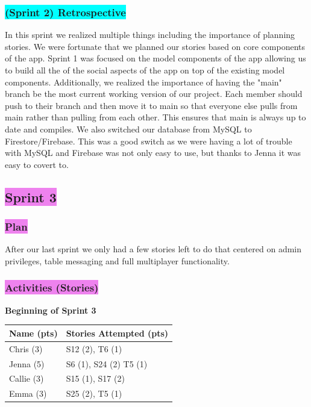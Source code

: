 \subsubsection{\colorbox{cyan}{(Sprint 2) Retrospective}}
In this sprint we realized multiple things including the importance of planning stories. We were fortunate that we planned our stories based on core components of the app. Sprint 1 was focused on the model components of the app allowing us to build all the of the social aspects of the app on top of the existing model components. Additionally, we realized the importance of having the "main" branch be the most current working version of our project. Each member should push to their branch and then move it to main so that everyone else pulls from main rather than pulling from each other. This ensures that main is always up to date and compiles. We also switched our database from MySQL to Firestore/Firebase. This was a good switch as we were having a lot of trouble with MySQL and Firebase was not only easy to use, but thanks to Jenna it was easy to covert to. 


\subsection{\colorbox{violet}{Sprint 3}}

\subsubsection{\colorbox{violet}{Plan}}

\noindent After our last sprint we only had a few stories left to do that centered on admin privileges, table messaging and full multiplayer functionality.

\subsubsection{\colorbox{violet}{Activities (Stories)}}

\textbf{Beginning of Sprint 3}

\begin{table}[!hbt]
\begin{tabular}{|l|l|}
\hline
\multicolumn{1}{|c|}{\textbf{Name (pts)}} & \multicolumn{1}{c|}{\textbf{Stories Attempted (pts)}} \\ \hline
Chris (3)  & S12 (2), T6 (1)        \\ \hline
Jenna (5)  & S6 (1), S24 (2) T5 (1) \\ \hline
Callie (3) & S15 (1), S17 (2)       \\ \hline
Emma (3)   & S25 (2), T5 (1)        \\ \hline
\end{tabular}
\end{table}
\label{start sprint 3}


